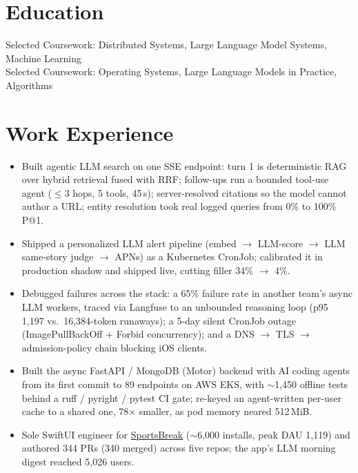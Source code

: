\documentclass[11pt, letterpaper]{article}
\begin{document}

\section{Education}
Selected Coursework: Distributed Systems, Large Language Model Systems, Machine Learning\\[1pt]
Selected Coursework: Operating Systems, Large Language Models in Practice, Algorithms

\section{Work Experience}
\begin{itemize}
  \item Built agentic LLM search on one SSE endpoint: turn 1 is deterministic RAG over hybrid retrieval fused with RRF; follow-ups run a bounded tool-use agent ($\le$3 hops, 5 tools, 45\,s); server-resolved citations so the model cannot author a URL; entity resolution took real logged queries from 0\% to 100\% P@1.
  \item Shipped a personalized LLM alert pipeline (embed $\to$ LLM-score $\to$ LLM same-story judge $\to$ APNs) as a Kubernetes CronJob; calibrated it in production shadow and shipped live, cutting filler 34\% $\to$ 4\%.
  \item Debugged failures across the stack: a 65\% failure rate in another team's async LLM workers, traced via Langfuse to an unbounded reasoning loop (p95 1{,}197 vs.\ 16{,}384-token runaways); a 5-day silent CronJob outage (ImagePullBackOff + Forbid concurrency); and a DNS $\to$ TLS $\to$ admission-policy chain blocking iOS clients.
  \item Built the async FastAPI / MongoDB (Motor) backend with AI coding agents from its first commit to 89 endpoints on AWS EKS, with $\sim$1{,}450 offline tests behind a ruff / pyright / pytest CI gate; re-keyed an agent-written per-user cache to a shared one, 78$\times$ smaller, as pod memory neared 512\,MiB.
  \item Sole SwiftUI engineer for \href{https://apps.apple.com/app/id6762649287}{SportsBreak} ($\sim$6{,}000 installs, peak DAU 1{,}119) and authored 344 PRs (340 merged) across five repos; the app's LLM morning digest reached 5{,}026 users.
\end{itemize}
\end{document}
